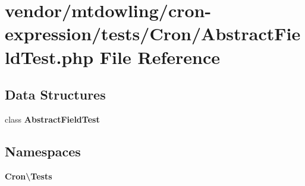 \section{vendor/mtdowling/cron-\/expression/tests/\+Cron/\+Abstract\+Field\+Test.php File Reference}
\label{_abstract_field_test_8php}
\subsection*{Data Structures}
\begin{DoxyCompactItemize}
\item 
class {\bf Abstract\+Field\+Test}
\end{DoxyCompactItemize}
\subsection*{Namespaces}
\begin{DoxyCompactItemize}
\item 
 {\bf Cron\textbackslash{}\+Tests}
\end{DoxyCompactItemize}

